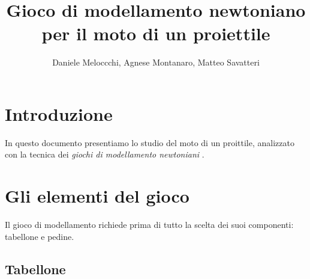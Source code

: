 \documentclass{article}
\title{Gioco di modellamento newtoniano per il moto di un proiettile}
\author{Daniele Meloccchi, Agnese Montanaro, Matteo Savatteri}
\begin{document}
\maketitle

\tableofcontents

\section{Introduzione}
In questo documento presentiamo lo studio del moto di un
proittile, analizzato con la tecnica dei \emph{giochi di modellamento newtoniani}
\cite{hestenes1992modeling}.

\section{Gli elementi del gioco}
Il gioco di modellamento richiede prima di tutto la scelta
dei suoi componenti: tabellone e pedine.

\subsection{Tabellone} 

{}

\end{document}
